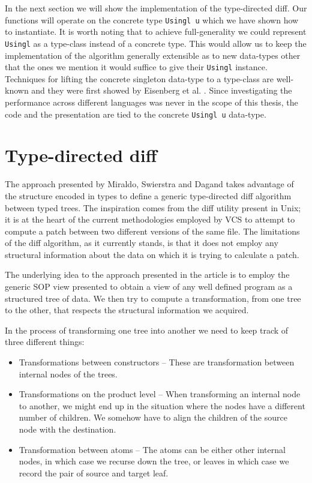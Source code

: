 \documentclass[11pt, titlepage]{article}
\newcommand{\toHaskell}[1]{\texttt{#1}\xspace}
\begin{document}
In the next section we will show the implementation of the type-directed diff. Our functions will operate on the concrete type \toHaskell{Usingl u} which we have shown how to instantiate.
It is worth noting that to achieve full-generality we could represent \toHaskell{Usingl} as a type-class instead of a concrete type. This would allow us to keep the implementation of the algorithm generally extensible as to new data-types other that the ones we mention it would suffice to give their \toHaskell{Usingl} instance. 
Techniques for lifting the concrete singleton data-type to a type-class are well-known and they were first showed by Eisenberg et al. \cite{singletons}. 
Since investigating the performance across different languages was never in the scope of this thesis, the code and the presentation are tied to the concrete \toHaskell{Usingl u} data-type.

\section{Type-directed diff}\label{type-directed-diff}

The approach presented by Miraldo, Swierstra and Dagand \cite{type-directed-diff} takes advantage of the structure encoded in types to define a generic type-directed diff algorithm between typed trees. 
The inspiration comes from the diff utility present in Unix; it is at the heart of the current methodologies employed by VCS to attempt to compute a patch between two different versions of the same file. 
The limitations of the diff algorithm, as it currently stands, is that it does not employ any structural information about the data on which it is trying to calculate a patch. 

The underlying idea to the approach presented in the article is to employ
the generic SOP view presented to obtain a view of any well defined program as a structured tree of data.  
We then try to compute a transformation, from one tree to the other, that respects the structural information we acquired.

In the process of transforming one tree into another we need to keep track of three different things: 
\begin{itemize}
  \item Transformations between constructors -- These are transformation between internal nodes of the trees.
  \item Transformations on the product level -- When transforming an internal node to another, we might end up in the situation where the nodes have a different number of children. We somehow have to align the children of the source node with the destination.
  \item Transformation between atoms -- The atoms can be either other internal nodes, in which case we recurse down the tree, or leaves in which case we record the pair of source and target leaf.
\end{itemize}
\end{document}
